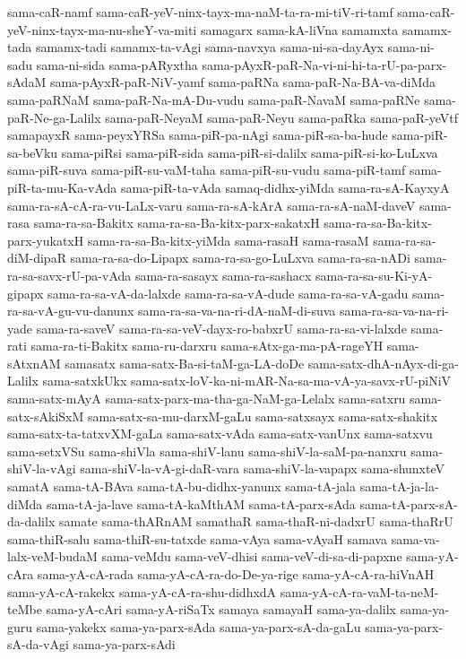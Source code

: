 {sama-caR-namf
sama-caR-yeV-ninx-tayx-ma-naM-ta-ra-mi-tiV-ri-tamf
sama-caR-yeV-ninx-tayx-ma-nu-sheY-va-miti
samagarx
sama-kA-liVna
samamxta
samamx-tada
samamx-tadi
samamx-ta-vAgi
sama-navxya
sama-ni-sa-dayAyx
sama-ni-sadu
sama-ni-sida
sama-pARyxtha
sama-pAyxR-paR-Na-vi-ni-hi-ta-rU-pa-parx-sAdaM
sama-pAyxR-paR-NiV-yamf
sama-paRNa
sama-paR-Na-BA-va-diMda
sama-paRNaM
sama-paR-Na-mA-Du-vudu
sama-paR-NavaM
sama-paRNe
sama-paR-Ne-ga-Lalilx
sama-paR-NeyaM
sama-paR-Neyu
sama-paRka
sama-paR-yeVtf
samapayxR
sama-peyxYRSa
sama-piR-pa-nAgi
sama-piR-sa-ba-hude
sama-piR-sa-beVku
sama-piRsi
sama-piR-sida
sama-piR-si-dalilx
sama-piR-si-ko-LuLxva
sama-piR-suva
sama-piR-su-vaM-taha
sama-piR-su-vudu
sama-piR-tamf
sama-piR-ta-mu-Ka-vAda
sama-piR-ta-vAda
samaq-didhx-yiMda
sama-ra-sA-KayxyA
sama-ra-sA-cA-ra-vu-LaLx-varu
sama-ra-sA-kArA
sama-ra-sA-naM-daveV
sama-rasa
sama-ra-sa-Bakitx
sama-ra-sa-Ba-kitx-parx-sakatxH
sama-ra-sa-Ba-kitx-parx-yukatxH
sama-ra-sa-Ba-kitx-yiMda
sama-rasaH
sama-rasaM
sama-ra-sa-diM-dipaR
sama-ra-sa-do-Lipapx
sama-ra-sa-go-LuLxva
sama-ra-sa-nADi
sama-ra-sa-savx-rU-pa-vAda
sama-ra-sasayx
sama-ra-sashacx
sama-ra-sa-su-Ki-yA-gipapx
sama-ra-sa-vA-da-lalxde
sama-ra-sa-vA-dude
sama-ra-sa-vA-gadu
sama-ra-sa-vA-gu-vu-danunx
sama-ra-sa-va-na-ri-dA-naM-di-suva
sama-ra-sa-va-na-ri-yade
sama-ra-saveV
sama-ra-sa-veV-dayx-ro-babxrU
sama-ra-sa-vi-lalxde
sama-rati
sama-ra-ti-Bakitx
sama-ru-darxru
sama-sAtx-ga-ma-pA-rageYH
sama-sAtxnAM
samasatx
sama-satx-Ba-si-taM-ga-LA-doDe
sama-satx-dhA-nAyx-di-ga-Lalilx
sama-satxkUkx
sama-satx-loV-ka-ni-mAR-Na-sa-ma-vA-ya-savx-rU-piNiV
sama-satx-mAyA
sama-satx-parx-ma-tha-ga-NaM-ga-Lelalx
sama-satxru
sama-satx-sAkiSxM
sama-satx-sa-mu-darxM-gaLu
sama-satxsayx
sama-satx-shakitx
sama-satx-ta-tatxvXM-gaLa
sama-satx-vAda
sama-satx-vanUnx
sama-satxvu
sama-setxVSu
sama-shiVla
sama-shiV-lanu
sama-shiV-la-saM-pa-nanxru
sama-shiV-la-vAgi
sama-shiV-la-vA-gi-daR-vara
sama-shiV-la-vapapx
sama-shunxteV
samatA
sama-tA-BAva
sama-tA-bu-didhx-yanunx
sama-tA-jala
sama-tA-ja-la-diMda
sama-tA-ja-lave
sama-tA-kaMthAM
sama-tA-parx-sAda
sama-tA-parx-sA-da-dalilx
samate
sama-thARnAM
samathaR
sama-thaR-ni-dadxrU
sama-thaRrU
sama-thiR-salu
sama-thiR-su-tatxde
sama-vAya
sama-vAyaH
samava
sama-va-lalx-veM-budaM
sama-veMdu
sama-veV-dhisi
sama-veV-di-sa-di-papxne
sama-yA-cAra
sama-yA-cA-rada
sama-yA-cA-ra-do-De-ya-rige
sama-yA-cA-ra-hiVnAH
sama-yA-cA-rakekx
sama-yA-cA-ra-shu-didhxdA
sama-yA-cA-ra-vaM-ta-neM-teMbe
sama-yA-cAri
sama-yA-riSaTx
samaya
samayaH
sama-ya-dalilx
sama-ya-guru
sama-yakekx
sama-ya-parx-sAda
sama-ya-parx-sA-da-gaLu
sama-ya-parx-sA-da-vAgi
sama-ya-parx-sAdi
}

